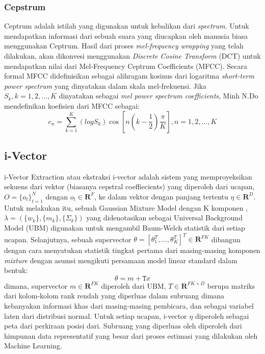 \subsubsection{Cepstrum}
Ceptrum adalah istilah yang digunakan untuk kebalikan dari \textit{spectrum}. Untuk mendapatkan informasi dari sebuah suara yang diucapkan oleh manusia biasa menggunakan Ceptrum. Hasil dari proses \textit{mel-frequency wrapping} yang telah dilakukan, akan dikonvesi menggunakan \textit{Discrete Cosine Transform} (DCT) untuk mendapatkan nilai dari Mel-Frequency Ceptrum Coefficients (MFCC).
Secara formal MFCC didefinisikan sebagai alihragam kosinus dari logaritma \textit{short-term power spectrum} yang dinyatakan dalam skala mel-frekuensi. Jika $S_k, k = 1,2, \ldots, K$ dinyatakan sebagai \textit{mel power spectrum coefficients}, Minh N.Do mendefinikan koefisien dari MFCC sebagai:
\begin{equation}
c_n = \sum_{k=1}^{K} (log S_k) \cos\left[ n(k- \frac{1}{2}) \frac{\pi}{K} \right] , n = 1,2, \ldots ,K
\end{equation}


\subsection{i-Vector}
i-Vector Extraction atau ekstraksi i-vector adalah sistem yang memproyeksikan sekuens dari vektor (biasanya cepstral coeffiecients) yang diperoleh dari ucapan, $ O = \lbrace o_t\rbrace_{t=1}^{N} $ dengan $ o_t \in \mathbf{R}^F $, ke dalam vektor dengan panjang tertentu $ \eta \in \mathbf{R}^D $. Untuk melakukan itu, sebuah Gaussian Mixture Model dengan K komponen , $ \lambda = ( \lbrace w_k \rbrace, \lbrace m_k \rbrace,\lbrace \Sigma_k \rbrace) $ yang didenotasikan sebagai Universal Background Model (UBM) digunakan untuk mengambil Baum-Welch statistik dari setiap ucapan. Selanjutnya, sebuah supervector $ \theta = [ \theta_1^T, \ldots,  \theta_K^T]^T \in \mathbf{R}^{FK}$ dibangun dengan cara menyatukan statistik tingkat pertama dari masing-masing komponen \textit{mixture} dengan asumsi mengikuti persamaan model linear standard dalam bentuk:
\begin{equation}
\theta = m+\mathtt{T}x 
\end{equation}
dimana, supervector $ m \in \mathbf{R}^{FK} $ diperoleh dari UBM, $ T \in \mathbf{R}^{FK \times D}$ berupa matriks dari kolom-kolom rank rendah yang diperluas dalam subruang dimana kebanyakan informasi khas dari masing-masing pembicara, dan  sebagai variabel laten dari distribusi normal. Untuk setiap ucapan, i-vector $\eta$ diperoleh sebagai peta dari  perkiraan posisi dari. Subruang yang diperluas oleh  diperoleh dari himpunan data representatif yang besar  dari proses estimasi yang dilakukan oleh Machine Learning.
